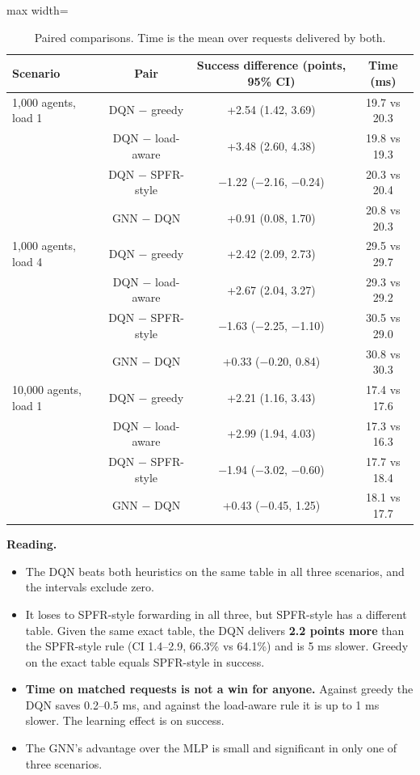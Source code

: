 \documentclass[journal]{IEEEtran}
\begin{document}
\begin{table}[!t]
\centering
\caption{Paired comparisons. Time is the mean over requests delivered by both.}
\label{tab:8}
\footnotesize
\begin{adjustbox}{max width=\textwidth}
\begin{tabular}{lccc}
\toprule
Scenario & Pair & Success difference (points, 95\% CI) & Time (ms) \\
\midrule
1,000 agents, load 1 & DQN $-$ greedy & +2.54 (1.42, 3.69) & 19.7 vs 20.3 \\
 & DQN $-$ load-aware & +3.48 (2.60, 4.38) & 19.8 vs 19.3 \\
 & DQN $-$ SPFR-style & $-$1.22 ($-$2.16, $-$0.24) & 20.3 vs 20.4 \\
 & GNN $-$ DQN & +0.91 (0.08, 1.70) & 20.8 vs 20.3 \\
1,000 agents, load 4 & DQN $-$ greedy & +2.42 (2.09, 2.73) & 29.5 vs 29.7 \\
 & DQN $-$ load-aware & +2.67 (2.04, 3.27) & 29.3 vs 29.2 \\
 & DQN $-$ SPFR-style & $-$1.63 ($-$2.25, $-$1.10) & 30.5 vs 29.0 \\
 & GNN $-$ DQN & +0.33 ($-$0.20, 0.84) & 30.8 vs 30.3 \\
10,000 agents, load 1 & DQN $-$ greedy & +2.21 (1.16, 3.43) & 17.4 vs 17.6 \\
 & DQN $-$ load-aware & +2.99 (1.94, 4.03) & 17.3 vs 16.3 \\
 & DQN $-$ SPFR-style & $-$1.94 ($-$3.02, $-$0.60) & 17.7 vs 18.4 \\
 & GNN $-$ DQN & +0.43 ($-$0.45, 1.25) & 18.1 vs 17.7 \\
\bottomrule
\end{tabular}
\end{adjustbox}
\end{table}

\textbf{Reading.}

\begin{itemize}
\item The DQN beats both heuristics on the same table in all three scenarios, and the intervals exclude zero.
\item It loses to SPFR-style forwarding in all three, but SPFR-style has a different table. Given the same exact table, the DQN delivers \textbf{2.2 points more} than the SPFR-style rule (CI 1.4--2.9, 66.3\% vs 64.1\%) and is 5 ms slower. Greedy on the exact table equals SPFR-style in success.
\item \textbf{Time on matched requests is not a win for anyone.} Against greedy the DQN saves 0.2--0.5 ms, and against the load-aware rule it is up to 1 ms slower. The learning effect is on success.
\item The GNN's advantage over the MLP is small and significant in only one of three scenarios.
\end{itemize}
\end{document}
